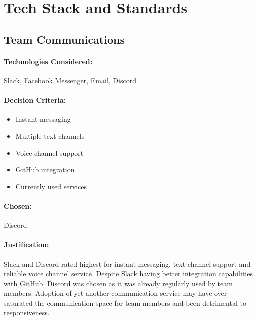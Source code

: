 
\section{Tech Stack and Standards}
\begin{spacing}{1.3}

\subsection{Team Communications}
\paragraph{Technologies Considered:}
Slack, Facebook Messenger, Email, Discord

\paragraph{Decision Criteria:}
\begin{itemize}
\item Instant messaging
\item Multiple text channels
\item Voice channel support
\item GitHub integration
\item Currently used services
\end{itemize}

\paragraph{Chosen:}
Discord

\paragraph{Justification:}
Slack and Discord rated highest for instant messaging, text channel support and reliable voice channel service. Despite Slack having better integration capabilities with GitHub, Discord was chosen as it was already regularly used by team members. Adoption of yet another communication service may have over-saturated the communication space for team members and been detrimental to responsiveness.


\end{spacing}
